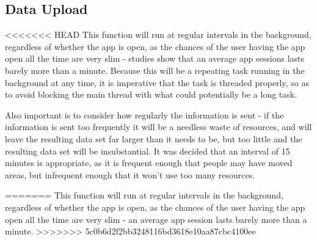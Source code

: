 \documentclass[11pt]{informatics-report}
\begin{document}
\subsection{Data Upload}

<<<<<<< HEAD
This function will run at regular intervals in the background, regardless of whether the app is open, as the chances of the user having the app open all the time are very slim - studies show that an average app sessions lasts barely more than a minute\cite{Bohmer:2011:FAA:2037373.2037383}. Because this will be a repeating task running in the background at any time, it is imperative that the task is threaded properly, so as to avoid blocking the main thread with what could potentially be a long task. 

Also important is to consider how regularly the information is sent - if the information is sent too frequently it will be a needless waste of resources, and will leave the resulting data set far larger than it needs to be, but too little and the resulting data set will be insubstantial. It was decided that an interval of 15 minutes is appropriate, as it is frequent enough that people may have moved areas, but infrequent enough that it won't use too many resources. 


=======
This function will run at regular intervals in the background, regardless of whether the app is open, as the chances of the user having the app open all the time are very slim - an average app session lasts barely more than a minute\cite{Bohmer:2011:FAA:2037373.2037383}. 
>>>>>>> 5c0b6d2f2bb3248116bd3618e10aa87cbc4100ee

%
%
%
%
%
%






\appendix

%
%
\end{document}
